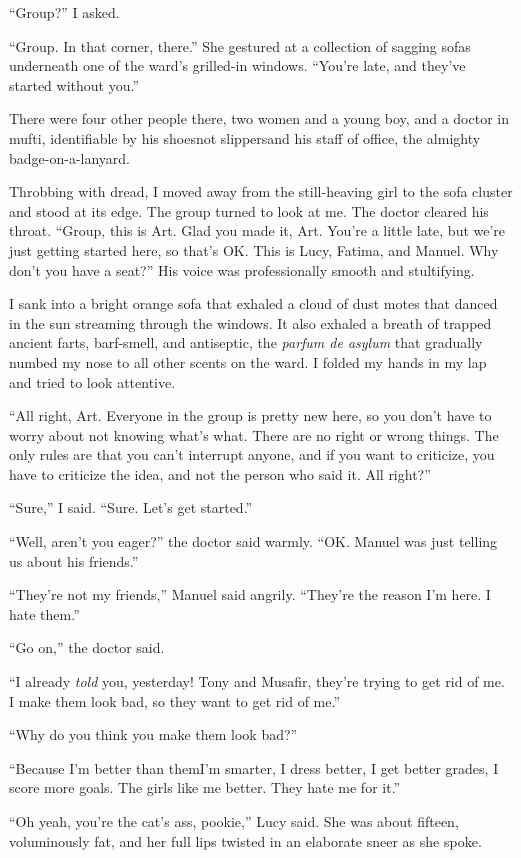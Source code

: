 “Group?” I asked.

“Group. In that corner, there.” She gestured at a collection of
sagging sofas underneath one of the ward’s grilled-in windows.
“You’re late, and they’ve started without you.”

There were four other people there, two women and a young boy, and
a doctor in mufti, identifiable by his shoes{\dash}not slippers{\dash}and his
staff of office, the almighty badge-on-a-lanyard.

Throbbing with dread, I moved away from the still-heaving girl to
the sofa cluster and stood at its edge. The group turned to look at
me. The doctor cleared his throat. “Group, this is Art. Glad you
made it, Art. You’re a little late, but we’re just getting started
here, so that’s OK. This is Lucy, Fatima, and Manuel. Why don’t you
have a seat?” His voice was professionally smooth and stultifying.

I sank into a bright orange sofa that exhaled a cloud of dust motes
that danced in the sun streaming through the windows. It also
exhaled a breath of trapped ancient farts, barf-smell, and
antiseptic, the \emph{parfum de asylum} that gradually numbed my
nose to all other scents on the ward. I folded my hands in my lap
and tried to look attentive.

“All right, Art. Everyone in the group is pretty new here, so you
don’t have to worry about not knowing what’s what. There are no
right or wrong things. The only rules are that you can’t interrupt
anyone, and if you want to criticize, you have to criticize the
idea, and not the person who said it. All right?”

“Sure,” I said. “Sure. Let’s get started.”

“Well, aren’t you eager?” the doctor said warmly. “OK. Manuel was
just telling us about his friends.”

“They’re not my friends,” Manuel said angrily. “They’re the reason
I’m here. I hate them.”

“Go on,” the doctor said.

“I already \emph{told} you, yesterday! Tony and Musafir, they’re
trying to get rid of me. I make them look bad, so they want to get
rid of me.”

“Why do you think you make them look bad?”

“Because I’m better than them{\dash}I’m smarter, I dress better, I get
better grades, I score more goals. The girls like me better. They
hate me for it.”

“Oh yeah, you’re the cat’s ass, pookie,” Lucy said. She was about
fifteen, voluminously fat, and her full lips twisted in an
elaborate sneer as she spoke.

